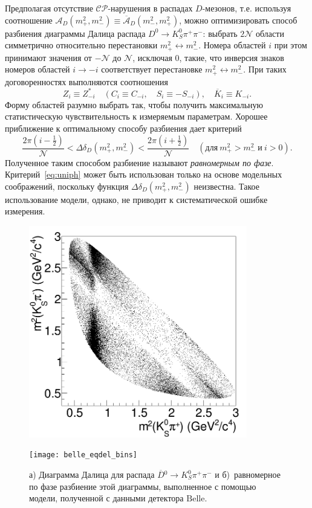\documentclass[a4paper,14pt]{extarticle} %
\newcommand{\dn}{\ensuremath{D^0}\xspace}
\newcommand{\dbar}{\ensuremath{\overline{D}}\xspace}
\newcommand{\dnbar}{\ensuremath{\dbar{}^0}\xspace}
\newcommand{\ks}{\ensuremath{K_S^0}\xspace}
\newcommand{\deld}{\ensuremath{\Delta\delta_D}\xspace}
\newcommand{\dnkpp}{\ensuremath{\dn\to\ks\pi^+\pi^-}\xspace}
\newcommand{\dbkpp}{\ensuremath{\dnbar\to\ks\pi^+\pi^-}\xspace}
\newcommand{\mpsq}{\ensuremath{m_+^2}\xspace}
\newcommand{\mmsq}{\ensuremath{m_-^2}\xspace}
\newcommand{\mca}{\ensuremath{\mathcal{A}}\xspace}
\newcommand{\mcn}{\ensuremath{\mathcal{N}}\xspace}
\newcommand{\mcabar}{\ensuremath{\overline{\mca}}\xspace}
\newcommand{\ad}{\ensuremath{\mca_D}}
\newcommand{\adbar}{\ensuremath{\mcabar_D}}
\newcommand{\dvar}{\ensuremath{\left(\mpsq,\mmsq\right)}\xspace}
\newcommand{\dvarinv}{\ensuremath{\left(\mmsq,\mpsq\right)}\xspace}
\newcommand{\cpconj}{\ensuremath{\mathcal{CP}}\xspace}
\newcommand{\kmi}{\ensuremath{K_{-i}}\xspace}
\newcommand{\zi}{\ensuremath{Z_i}\xspace}
\newcommand{\kb}{\ensuremath{\overline{K}}\xspace}
\newcommand{\kbi}{\ensuremath{\kb_{i}}\xspace}
\newcommand{\belle}{\ensuremath{\mathrm{Belle}}\xspace}
\begin{document}
Предполагая отсутствие \cpconj-нарушения в распадах $D$-мезонов, т.е. используя соотношение $\ad\dvar\equiv\adbar\dvarinv$, можно оптимизировать способ разбиения диаграммы Далица распада \dnkpp: выбрать $2\mcn$ области симметрично относительно перестановки $\mpsq\leftrightarrow\mmsq$.  Номера областей $i$ при этом принимают значения от $-\mcn$ до $\mcn$, исключая $0$, такие, что инверсия знаков номеров областей $i\to -i$ соответствует перестановке $\mpsq\leftrightarrow\mmsq$. При таких договоренностях выполняются соотношения
\begin{equation}\label{eq:cp-conserv-relations}
 \zi \equiv Z^*_{-i}\quad (C_i\equiv C_{-i},\quad S_i\equiv -S_{-i}),\quad \kbi \equiv \kmi.
\end{equation}
Форму областей разумно выбрать так, чтобы получить максимальную статистическую чувствительность к измеряемым параметрам.  Хорошее приближение к оптимальному способу разбиения дает критерий
\begin{equation}\label{eq:uniph}
 \frac{2\pi\left(i-\frac{1}{2}\right)}{\mcn} < \deld\dvar < \frac{2\pi\left(i+\frac{1}{2}\right)}{\mcn}\quad
 \left(\textrm{для}\ \mpsq>\mmsq\ \textrm{и}\ i>0\right).
\end{equation}
Полученное таким способом разбиение называют \emph{равномерным по фазе}.  Критерий~\eqref{eq:uniph} может быть использован только на основе модельных соображений, поскольку функция $\deld\dvar$ неизвестна.  Такое использование модели, однако, не приводит к систематической ошибке измерения.

\begin{figure}[htb]
\begin{minipage}[b]{0.5\textwidth}
 \centering
  \includegraphics[width=0.85\textwidth]{dp_mc.png}
 \subcaption{}
 \label{fig:dalitz}
\end{minipage}
\begin{minipage}[b]{0.5\textwidth}
 \centering
  \texttt{[image: belle\_eqdel\_bins]}
 \subcaption{}
 \label{fig:bd_belle_eqph}
\end{minipage}
 \caption{а) Диаграмма Далица для распада \dbkpp и б)~равномерное по фазе разбиение этой диаграммы, выполненное с помощью модели, полученной с данными детектора \belle.}
 \label{fig:dalitz_plot}
\end{figure}
\end{document}
